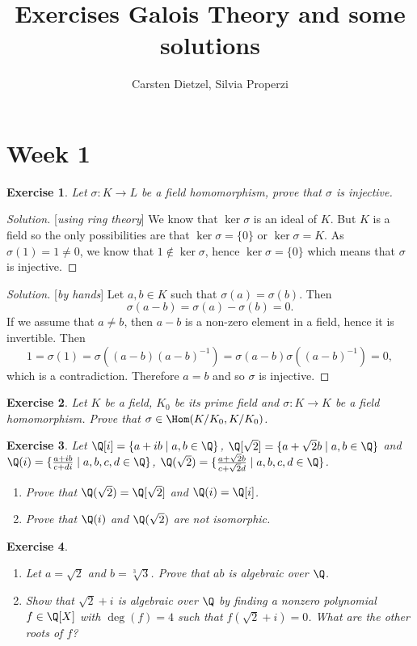 \documentclass[a4paper,10pt,reqno]{amsart}
\title{Exercises Galois Theory and some solutions}
\author{Carsten Dietzel, Silvia Properzi}
\newtheorem{ex}{Exercise}[section]
\newenvironment{sol}
  {\renewcommand\qedsymbol{$\blacksquare$}\begin{proof}[Solution]}
  {\end{proof}}
\begin{document}
\maketitle
\section{Week 1}


\begin{ex}
\label{1.1}
    Let $\sigma : K\to L$ be a field homomorphism, prove that $\sigma$ is injective.
\end{ex}
\begin{sol}[\textit{using ring theory}]
    We know that $\ker\sigma$ is an ideal of $K$.
    But $K$ is a field so the only possibilities are that $\ker\sigma=\{0\}$ or $\ker\sigma=K$.
    As $\sigma(1)=1\neq 0$, we know that $1\not\in \ker\sigma$, hence $\ker\sigma=\{0\}$ which means that $\sigma$ is injective.
\end{sol}
\begin{sol}[\textit{by hands}]
    Let $a,b\in K$ such that $\sigma(a)=\sigma(b)$.
    Then 
    \[
    \sigma(a-b)=\sigma(a)-\sigma(b)=0.
    \]
    If we assume that $a\neq b$, then $a-b$ is a non-zero element in a field, hence it is invertible.
    Then 
    \[
    1=\sigma(1)=\sigma((a-b)(a-b)^{-1})=
    \sigma(a-b)\sigma((a-b)^{-1})=0,
    \]
    which is a contradiction.
    Therefore $a=b$ and so $\sigma$ is injective.
\end{sol}

\begin{ex}
\label{1.2}
    Let $K$ be a field, $K_0$ be its prime field and $\sigma:K\to K$ be a field homomorphism. Prove that $\sigma\in\Hom(K/K_0,K/K_0)$.
\end{ex}


\begin{ex}
\label{1.3}
Let $\Q[i]=\{a+ib\mid a,b\in \Q\}$, $\Q[\sqrt{2}]=\{a+\sqrt{2}b\mid a,b\in\Q\}$ and $\Q(i)=\{\frac{a+ib}{c+di}\mid a,b,c,d\in \Q\}$, $\Q(\sqrt{2})=\{\frac{a+\sqrt{2}b}{c+\sqrt{2}d}\mid a,b,c,d\in\Q\}$.

\begin{enumerate}[label=(\roman*)]
    \item Prove that $\Q(\sqrt{2})=\Q[\sqrt{2}]$ and $\Q(i)=\Q[i]$.
    \item Prove that $\Q(i)$ and $\Q(\sqrt{2})$ are not isomorphic.
\end{enumerate}
\end{ex}

\begin{ex}
\label{1.4}~
    \begin{enumerate}[label=(\roman*)]
        \item Let $a=\sqrt{2}$ and $b=\sqrt[3]{3}$. Prove that $ab$ is algebraic over $\Q$.
        \item Show that $\sqrt{2} + i$ is algebraic over $\Q$ by finding a nonzero polynomial $f \in \Q[X]$ with $\deg(f) = 4$ such that $f(\sqrt{2} + i) = 0$. What are the other roots of $f$?
    \end{enumerate}
\end{ex}
\end{document}

